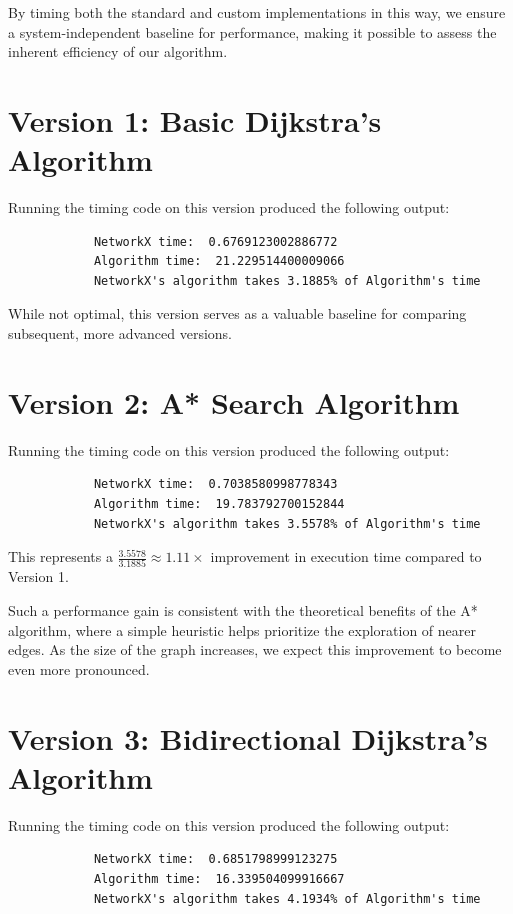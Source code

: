 	By timing both the standard and custom implementations in this way, we ensure a system-independent baseline for performance, making it possible to assess the inherent efficiency of our algorithm.

	 \section{Version 1: Basic Dijkstra's Algorithm}
	 	Running the timing code on this version produced the following output:
	 	\begin{verbatim}
	 		NetworkX time:  0.6769123002886772
	 		Algorithm time:  21.229514400009066
	 		NetworkX's algorithm takes 3.1885% of Algorithm's time
	 	\end{verbatim}
	 	While not optimal, this version serves as a valuable baseline for comparing subsequent, more advanced versions.

	 \section{Version 2: A* Search Algorithm}
	 	Running the timing code on this version produced the following output:
	 	\begin{verbatim}
			NetworkX time:  0.7038580998778343
			Algorithm time:  19.783792700152844
			NetworkX's algorithm takes 3.5578% of Algorithm's time
	 	\end{verbatim}
	 	
	 	This represents a \(\frac{3.5578}{3.1885} \approx 1.11\times\) improvement in execution time compared to Version 1. \newline
	 	
	 	Such a performance gain is consistent with the theoretical benefits of the A* algorithm, where a simple heuristic helps prioritize the exploration of nearer edges. As the size of the graph increases, we expect this improvement to become even more pronounced.
	 
	 \section{Version 3: Bidirectional Dijkstra's Algorithm}
	 	Running the timing code on this version produced the following output:
	 	\begin{verbatim}
	 		NetworkX time:  0.6851798999123275
	 		Algorithm time:  16.339504099916667
	 		NetworkX's algorithm takes 4.1934% of Algorithm's time
	 	\end{verbatim}
	 
